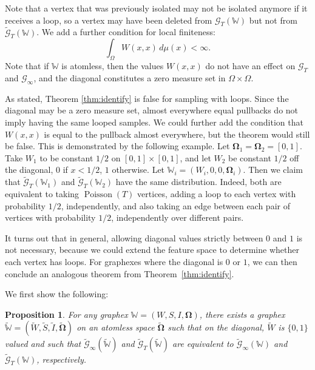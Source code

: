 \documentclass{amsart}
\numberwithin{equation}{section}
\numberwithin{figure}{section}
\newtheorem{proposition}[theorem]{Proposition}
\theoremstyle{definition}
\theoremstyle{remark}
\DeclareMathOperator{\Poisson}{Poisson}
\newcommand{\bOmega}{{\mathbf{\Omega}}}
\newcommand{\cW}{\mathbb{W}}
\newcommand{\cG}{\mathcal{G}}
\begin{document}
Note that a vertex that was previously isolated may not be isolated anymore
if it receives a loop, so a vertex may have been deleted from $\cG_T(\cW)$
but not from $\widetilde{\cG}_T(\cW)$. We add a further condition for local
finiteness: \[\int_\Omega W(x,x) \,d\mu(x) < \infty.\] Note that if $\cW$ is
atomless, then the values $W(x,x)$ do not have an effect on $\cG_T$ and
$\cG_\infty$, and the diagonal constitutes a zero measure set in $\Omega
\times \Omega$.

As stated, Theorem \ref{thm:identify} is false for sampling with loops. Since
the diagonal may be a zero measure set, almost everywhere equal pullbacks do
not imply having the same looped samples. We could further add the condition
that $W(x,x)$ is equal to the pullback almost everywhere, but the theorem
would still be false. This is demonstrated by the following example. Let
$\bOmega_1=\bOmega_2=[0,1]$. Take $W_1$ to be constant $1/2$ on $[0,1] \times
[0,1]$, and let $W_2$ be constant $1/2$ off the diagonal, $0$ if $x<1/2$, $1$
otherwise. Let $\cW_i=(W_i,0,0,\bOmega_i)$. Then we claim that
$\widetilde{\cG}_T(\cW_1)$ and $\widetilde{\cG}_T(\cW_2)$ have the same
distribution. Indeed, both are equivalent to taking $\Poisson(T)$ vertices,
adding a loop to each vertex with probability $1/2$, independently, and also
taking an edge between each pair of vertices with probability $1/2$,
independently over different pairs.

It turns out that in general, allowing diagonal values strictly between $0$
and $1$ is not necessary, because we could extend the feature space to
determine whether each vertex has loops. For graphexes where the diagonal is
$0$ or $1$, we can then conclude an analogous theorem from
Theorem~\ref{thm:identify}.

We first show the following:

\begin{proposition}
For any graphex $\cW=(W,S,I,\bOmega)$, there exists a graphex
$\widetilde{\cW}=(\widetilde{W},\widetilde{S},\widetilde{I},\widetilde{\bOmega})$
on an atomless space $\widetilde\bOmega$ such that on the diagonal,
$\widetilde W$ is $\{0,1\}$ valued and such that
$\widetilde{\cG}_\infty(\widetilde{\cW})$ and
$\widetilde{\cG}_T(\widetilde{\cW})$ are equivalent to
$\widetilde{\cG}_\infty(\cW)$ and $\widetilde{\cG}_T(\cW)$, respectively.
\end{proposition}
\end{document}
